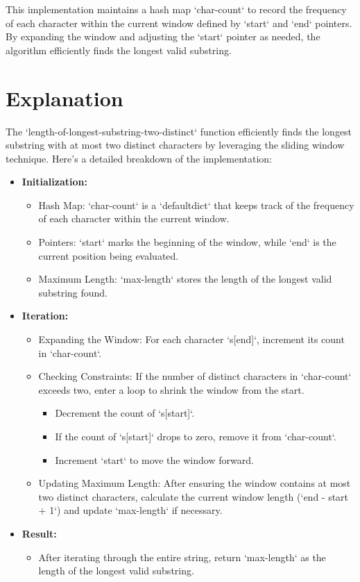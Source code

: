 This implementation maintains a hash map `char-count` to record the frequency of each character within the current window defined by `start` and `end` pointers. By expanding the window and adjusting the `start` pointer as needed, the algorithm efficiently finds the longest valid substring.

\section*{Explanation}

The `length-of-longest-substring-two-distinct` function efficiently finds the longest substring with at most two distinct characters by leveraging the sliding window technique. Here's a detailed breakdown of the implementation:

\begin{itemize}
    \item \textbf{Initialization:}
    \begin{itemize}
        \item Hash Map: `char-count` is a `defaultdict` that keeps track of the frequency of each character within the current window.
        \item Pointers: `start` marks the beginning of the window, while `end` is the current position being evaluated.
        \item Maximum Length: `max-length` stores the length of the longest valid substring found.
    \end{itemize}
    
    \item \textbf{Iteration:}
    \begin{itemize}
        \item Expanding the Window: For each character `s[end]`, increment its count in `char-count`.
        \item Checking Constraints: If the number of distinct characters in `char-count` exceeds two, enter a loop to shrink the window from the start.
            \begin{itemize}
                \item Decrement the count of `s[start]`.
                \item If the count of `s[start]` drops to zero, remove it from `char-count`.
                \item Increment `start` to move the window forward.
            \end{itemize}
        \item Updating Maximum Length: After ensuring the window contains at most two distinct characters, calculate the current window length (`end - start + 1`) and update `max-length` if necessary.
    \end{itemize}
    
    \item \textbf{Result:}
    \begin{itemize}
        \item After iterating through the entire string, return `max-length` as the length of the longest valid substring.
    \end{itemize}
\end{itemize}

